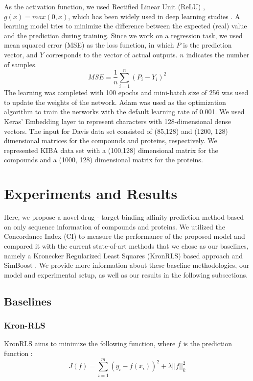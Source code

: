 \documentclass[11pt,letterpaper]{article}
\begin{document}
As the activation function, we used Rectified Linear Unit (ReLU) \cite{nair2010rectified}, $g(x) = max(0, x)$,  which has been widely used in deep learning studies \cite{lecun2015deep}. A learning model tries to minimize the difference between the expected (real) value and the prediction during training. Since we work on a regression task, we used mean squared error (MSE) as the loss function, in which $P$ is the prediction vector, and $Y$ corresponds to the vector of actual outputs. $n$ indicates the number of samples.
\begin{equation}
MSE= \dfrac{1}{n}\sum_{i=1}^{n}(P_i - Y_i)^2
\end{equation}
The learning  was completed with 100 epochs and mini-batch size of 256 was used to update the weights of the network. Adam was used as the optimization algorithm to train the networks \cite{kingma2014adam} with the default learning rate  of 0.001.
We used Keras' Embedding layer to represent characters with 128-dimensional dense vectors. The input for Davis data set consisted of (85,128) and (1200, 128) dimensional matrices for the compounds and proteins, respectively. We represented KIBA data set with a (100,128) dimensional matrix for the compounds and a (1000, 128) dimensional matrix for the  proteins. 



\section*{Experiments and Results}


Here, we propose a novel drug - target binding affinity prediction method based on only sequence information of compounds and proteins. We utilized the Concordance Index (CI) to measure the performance of the proposed model  and compared it with the current state-of-art methods that we chose as our baselines, namely a Kronecker Regularized Least Squares (KronRLS) based approach \cite{pahikkala2014toward} and SimBoost \cite{he2017simboost}.  We provide more information about these baseline methodologies, our model and experimental setup, as well as our results in the following subsections.

\subsection*{Baselines}

\subsubsection*{Kron-RLS}
KronRLS  aims to minimize the following function, where $f$ is the prediction function \cite{pahikkala2014toward}:
\begin{equation}\label{e:kronls}
J(f) = \sum_{i=1}^m {(y_i - f(x_i) )^2} + \lambda ||f||^2_k
\end{equation}
\end{document}
